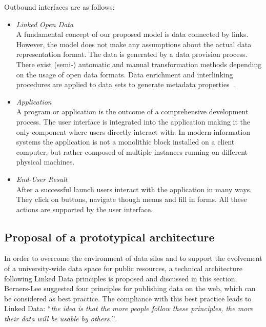 \documentclass{article}
\begin{document}
Outbound interfaces are as follows:
\begin{itemize}
	\item \textit{Linked Open Data}~\\
	A fundamental concept of our proposed model is data connected by links. However, the model does not make any assumptions about the actual data representation format. The data is generated by a data provision process. There exist (semi-) automatic and manual transformation methods depending on the usage of open data formats. Data enrichment and interlinking procedures are applied to data sets to generate metadata properties~\cite{inproceedings:soa-architecture}. 
	\item \textit{Application}~\\
	A program or application is the outcome of a comprehensive development process. The user interface is integrated into the application making it the only component where users directly interact with. In modern information systems the application is not a monolithic block installed on a client computer, but rather composed of multiple instances running on different physical machines. 
	\item \textit{End-User Result}~\\
	After a successful launch users interact with the application in many ways. They click on buttons, navigate though menus and fill in forms. All these actions are supported by the user interface.
\end{itemize}

\subsection{Proposal of a prototypical architecture}
\label{sec:application_architecture}
In order to overcome the environment of data silos and to support the evolvement of a university-wide data space for public resources, a technical architecture following Linked Data principles is proposed and discussed in this section. Berners-Lee suggested four principles for publishing data on the web, which can be considered as best practice. The compliance with this best practice leads to Linked Data: ``\textit{the idea is that the more people follow these principles, the more their data will be usable by others.}''\cite{simperl_using_2013}.
\end{document}
